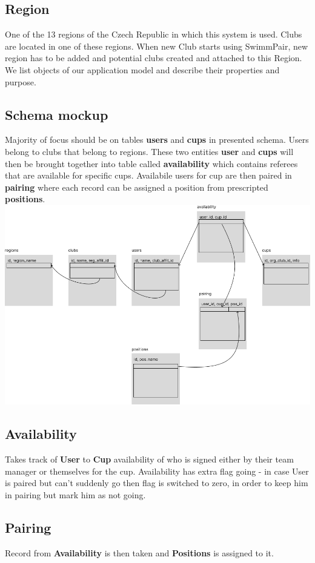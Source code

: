 \subsection*{Region}
One of the 13 regions of the Czech Republic in which this system is used. Clubs are located in one of these regions. When new Club starts using SwimmPair, new region has to be added and potential clubs created and attached to this Region. 
We list objects of our application model and describe their properties and purpose.
\newpage
\subsection*{Schema mockup}
Majority of focus should be on tables \textbf{users} and \textbf{cups} in presented schema. Users belong to clubs that belong to regions. These two entities \textbf{user} and \textbf{cups} will then be brought together into table called \textbf{availability} which contains referees that are available for specific cups. Availabile users for cup are then paired in \textbf{pairing} where each record can be assigned a position from prescripted \textbf{positions}.
\newline
\includegraphics[scale=0.430]{img/swimmpair_db_mockup.png}
\subsection*{Availability}
Takes track of \textbf{User} to \textbf{Cup} availability of who is signed either by their team manager or themselves for the cup. Availability has extra flag going - in case User is paired but can't suddenly go then flag is switched to zero, in order to keep him in pairing but mark him as not going.
\subsection*{Pairing}
Record from \textbf{Availability} is then taken and \textbf{Positions} is assigned to it. 
